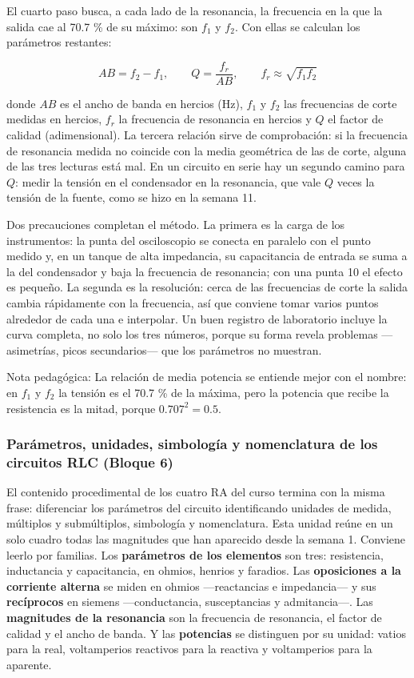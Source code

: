 \documentclass[11pt,letterpaper]{article}
\begin{document}
El cuarto paso busca, a cada lado de la resonancia, la frecuencia en la que la salida cae al 70.7 \% de su máximo: son $f_1$ y $f_2$. Con ellas se calculan los parámetros restantes:

\begin{equation}
  AB = f_2 - f_1, \qquad Q = \frac{f_r}{AB}, \qquad f_r \approx \sqrt{f_1 f_2}
\end{equation}

donde $AB$ es el ancho de banda en hercios (Hz), $f_1$ y $f_2$ las frecuencias de corte medidas en hercios, $f_r$ la frecuencia de resonancia en hercios y $Q$ el factor de calidad (adimensional). La tercera relación sirve de comprobación: si la frecuencia de resonancia medida no coincide con la media geométrica de las de corte, alguna de las tres lecturas está mal. En un circuito en serie hay un segundo camino para $Q$: medir la tensión en el condensador en la resonancia, que vale $Q$ veces la tensión de la fuente, como se hizo en la semana 11.

Dos precauciones completan el método. La primera es la carga de los instrumentos: la punta del osciloscopio se conecta en paralelo con el punto medido y, en un tanque de alta impedancia, su capacitancia de entrada se suma a la del condensador y baja la frecuencia de resonancia; con una punta \texttimes{}10 el efecto es pequeño. La segunda es la resolución: cerca de las frecuencias de corte la salida cambia rápidamente con la frecuencia, así que conviene tomar varios puntos alrededor de cada una e interpolar. Un buen registro de laboratorio incluye la curva completa, no solo los tres números, porque su forma revela problemas ---asimetrías, picos secundarios--- que los parámetros no muestran.

\begin{nota}{Nota pedagógica:}
La relación de media potencia se entiende mejor con el nombre: en $f_1$ y $f_2$ la tensión es el 70.7 \% de la máxima, pero la potencia que recibe la resistencia es la mitad, porque $0.707^2 = 0.5$.
\end{nota}

\subsubsection{Parámetros, unidades, simbología y nomenclatura de los circuitos RLC (Bloque 6)}

El contenido procedimental de los cuatro RA del curso termina con la misma frase: diferenciar los parámetros del circuito identificando unidades de medida, múltiplos y submúltiplos, simbología y nomenclatura. Esta unidad reúne en un solo cuadro todas las magnitudes que han aparecido desde la semana 1. Conviene leerlo por familias. Los \textbf{parámetros de los elementos} son tres: resistencia, inductancia y capacitancia, en ohmios, henrios y faradios. Las \textbf{oposiciones a la corriente alterna} se miden en ohmios ---reactancias e impedancia--- y sus \textbf{recíprocos} en siemens ---conductancia, susceptancias y admitancia---. Las \textbf{magnitudes de la resonancia} son la frecuencia de resonancia, el factor de calidad y el ancho de banda. Y las \textbf{potencias} se distinguen por su unidad: vatios para la real, voltamperios reactivos para la reactiva y voltamperios para la aparente.
\end{document}
